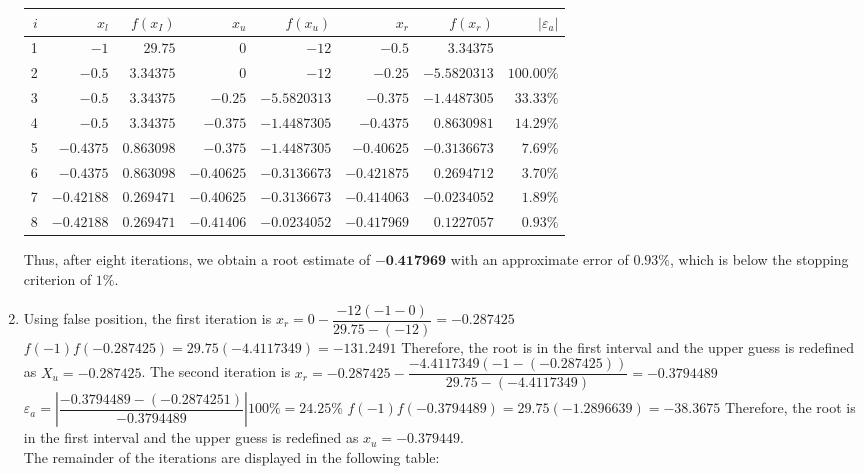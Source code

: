 \documentclass[../main.tex]{subfiles}
\begin{document}
\begin{enumerate}[label=\bfseries(\alph*)]
\begin{tabular}{|r|r|r|r|r|r|r|r|}
\hline
$i$ & $x_{l}$ & $f\left(x_{I}\right)$ & $x_{u}$ & $f\left(x_{u}\right)$ & $x_{r}$ & $f\left(x_{r}\right)$ & $\left|\varepsilon_{a}\right|$ \\
\hline
1 & $-1$ & $29.75$ & 0 & $-12$ & $-0.5$ & $3.34375$ &  \\
\hline
2 & $-0.5$ & $3.34375$ & 0 & $-12$ & $-0.25$ & $-5.5820313$ & $100.00 \%$ \\
\hline
3 & $-0.5$ & $3.34375$ & $-0.25$ & $-5.5820313$ & $-0.375$ & $-1.4487305$ & $33.33 \%$ \\
\hline
4 & $-0.5$ & $3.34375$ & $-0.375$ & $-1.4487305$ & $-0.4375$ & $0.8630981$ & $14.29 \%$ \\
\hline
5 & $-0.4375$ & $0.863098$ & $-0.375$ & $-1.4487305$ & $-0.40625$ & $-0.3136673$ & $7.69 \%$ \\
\hline
6 & $-0.4375$ & $0.863098$ & $-0.40625$ & $-0.3136673$ & $-0.421875$ & $0.2694712$ & $3.70 \%$ \\
\hline
7 & $-0.42188$ & $0.269471$ & $-0.40625$ & $-0.3136673$ & $-0.414063$ & $-0.0234052$ & $1.89 \%$ \\
\hline
8 & $-0.42188$ & $0.269471$ & $-0.41406$ & $-0.0234052$ & $-0.417969$ & $0.1227057$ & $0.93 \%$ \\
\hline
\end{tabular}
\bigbreak
Thus, after eight iterations, we obtain a root estimate of $\mathbf{- 0 . 4 1 7 9 6 9}$ with an approximate error of $0.93 \%$, which is below the stopping criterion of $1 \%$.
\bigbreak
\item Using false position, the first iteration is
\bigbreak
$x_{r}=0-\dfrac{-12(-1-0)}{29.75-(-12)}=-0.287425$
\bigbreak
$f(-1) f(-0.287425)=29.75(-4.4117349)=-131.2491$
\bigbreak
Therefore, the root is in the first interval and the upper guess is redefined as $X_{u}=-0.287425$.
\smallbreak
The second iteration is
\bigbreak
$x_{r}=-0.287425-\dfrac{-4.4117349(-1-(-0.287425))}{29.75-(-4.4117349)}=-0.3794489$
\bigbreak
$\varepsilon_{a}=\left|\dfrac{-0.3794489-(-0.2874251)}{-0.3794489}\right| 100 \%=24.25 \%$
\bigbreak
$f(-1) f(-0.3794489)=29.75(-1.2896639)=-38.3675$
\bigbreak
Therefore, the root is in the first interval and the upper guess is redefined as $x_{u}=-0.379449$.\\
The remainder of the iterations are displayed in the following table:
\bigbreak


\end{enumerate}
\end{document}
